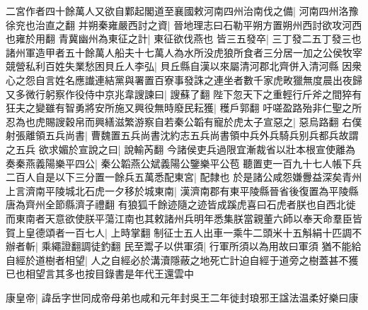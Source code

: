 二宮作者四十餘萬人又欲自鄴起閣道至襄國敕河南四州治南伐之備|{
	河南四州洛豫徐兖也治直之翻}
并朔秦雍嚴西討之資|{
	晉地理志曰石勒平朔方置朔州西討欲攻河西也雍於用翻}
青冀幽州為東征之計|{
	東征欲伐燕也}
皆三五發卒|{
	三丁發二五丁發三也}
諸州軍造甲者五十餘萬人船夫十七萬人為水所没虎狼所食者三分居一加之公侯牧宰競營私利百姓失業愁困貝丘人李弘|{
	貝丘縣自漢以來屬清河郡北齊併入清河縣}
因衆心之怨自言姓名應䜟連結黨與署置百寮事發誅之連坐者數千家虎畋獵無度晨出夜歸又多微行躬察作役侍中京兆韋謏諫曰|{
	謏蘇了翻}
陛下忽天下之重輕行斤斧之間猝有狂夫之變雖有智勇將安所施又興役無時廢民耘獲|{
	穫戶郭翻}
吁嗟盈路殆非仁聖之所忍為也虎賜謏穀帛而興繕滋繁游察自若秦公韜有寵於虎太子宣惡之|{
	惡烏路翻}
右僕射張離領五兵尚書|{
	曹魏置五兵尚書沈約志五兵尚書領中兵外兵騎兵别兵都兵故謂之五兵}
欲求媚於宣說之曰|{
	說輸芮翻}
今諸侯吏兵過限宜漸裁省以壯本根宣使離為奏秦燕義陽樂平四公|{
	秦公韜燕公斌義陽公鑒樂平公苞}
聽置吏一百九十七人帳下兵二百人自是以下三分置一餘兵五萬悉配東宮|{
	配隸也}
於是諸公咸怨嫌釁益深矣青州上言濟南平陵城北石虎一夕移於城東南|{
	漢濟南郡有東平陵縣晉省後復置為平陵縣唐為齊州全節縣濟子禮翻}
有狼狐千餘迹隨之迹皆成蹊虎喜曰石虎者朕也自西北徙而東南者天意欲使朕平蕩江南也其敕諸州兵明年悉集朕當親董六師以奉天命羣臣皆賀上皇德頌者一百七人|{
	上時掌翻}
制征士五人出車一乘牛二頭米十五斛絹十匹調不辦者斬|{
	乘繩證翻調徒釣翻}
民至鬻子以供軍須|{
	行軍所須以為用故曰軍須}
猶不能給自經於道樹者相望|{
	人之自經必於溝瀆隱蔽之地死亡計迫自經于道旁之樹蓋甚不獲已也相望言其多也按目錄書是年代王還雲中}


康皇帝|{
	諱岳字世同成帝母弟也咸和元年封吳王二年徙封琅邪王諡法温柔好樂曰康}


